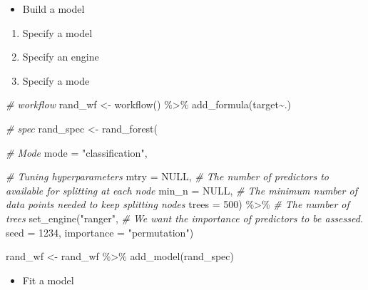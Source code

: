 \documentclass[
]{book}
\newenvironment{Shaded}{\begin{snugshade}}{\end{snugshade}}
\newcommand{\AttributeTok}[1]{\textcolor[rgb]{0.77,0.63,0.00}{#1}}
\newcommand{\CommentTok}[1]{\textcolor[rgb]{0.56,0.35,0.01}{\textit{#1}}}
\newcommand{\ConstantTok}[1]{\textcolor[rgb]{0.00,0.00,0.00}{#1}}
\newcommand{\DecValTok}[1]{\textcolor[rgb]{0.00,0.00,0.81}{#1}}
\newcommand{\FunctionTok}[1]{\textcolor[rgb]{0.00,0.00,0.00}{#1}}
\newcommand{\NormalTok}[1]{#1}
\newcommand{\OtherTok}[1]{\textcolor[rgb]{0.56,0.35,0.01}{#1}}
\newcommand{\SpecialCharTok}[1]{\textcolor[rgb]{0.00,0.00,0.00}{#1}}
\newcommand{\StringTok}[1]{\textcolor[rgb]{0.31,0.60,0.02}{#1}}
\providecommand{\tightlist}{%
  \setlength{\itemsep}{0pt}\setlength{\parskip}{0pt}}
\begin{document}
\begin{itemize}
\tightlist
\item
  Build a model
\end{itemize}

\begin{enumerate}
\def\labelenumi{\arabic{enumi}.}
\tightlist
\item
  Specify a model
\item
  Specify an engine
\item
  Specify a mode
\end{enumerate}

\begin{Shaded}
\begin{Highlighting}[]
\CommentTok{\# workflow }
\NormalTok{rand\_wf }\OtherTok{\textless{}{-}} \FunctionTok{workflow}\NormalTok{() }\SpecialCharTok{\%\textgreater{}\%} \FunctionTok{add\_formula}\NormalTok{(target}\SpecialCharTok{\textasciitilde{}}\NormalTok{.)}

\CommentTok{\# spec }
\NormalTok{rand\_spec }\OtherTok{\textless{}{-}} \FunctionTok{rand\_forest}\NormalTok{(}
  
           \CommentTok{\# Mode }
           \AttributeTok{mode =} \StringTok{"classification"}\NormalTok{,}
           
           \CommentTok{\# Tuning hyperparameters}
           \AttributeTok{mtry =} \ConstantTok{NULL}\NormalTok{, }\CommentTok{\# The number of predictors to available for splitting at each node  }
           \AttributeTok{min\_n =} \ConstantTok{NULL}\NormalTok{, }\CommentTok{\# The minimum number of data points needed to keep splitting nodes}
           \AttributeTok{trees =} \DecValTok{500}\NormalTok{) }\SpecialCharTok{\%\textgreater{}\%} \CommentTok{\# The number of trees}
  \FunctionTok{set\_engine}\NormalTok{(}\StringTok{"ranger"}\NormalTok{, }
             \CommentTok{\# We want the importance of predictors to be assessed.}
             \AttributeTok{seed =} \DecValTok{1234}\NormalTok{, }
             \AttributeTok{importance =} \StringTok{"permutation"}\NormalTok{) }

\NormalTok{rand\_wf }\OtherTok{\textless{}{-}}\NormalTok{ rand\_wf }\SpecialCharTok{\%\textgreater{}\%} \FunctionTok{add\_model}\NormalTok{(rand\_spec)}
\end{Highlighting}
\end{Shaded}

\begin{itemize}
\tightlist
\item
  Fit a model
\end{itemize}
\end{document}
